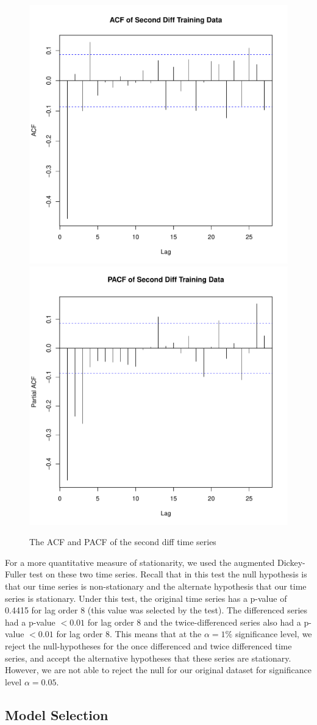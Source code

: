 \documentclass[11pt]{paper}
\begin{document}
\begin{figure}
\centering
\includegraphics[width=0.45\linewidth]{../image/acf_second_diff.pdf}
\includegraphics[width=0.45\linewidth]{../image/pacf_second_diff.pdf}
\caption{The ACF and PACF of the second diff time series}
\label{second_acf_pacf}
\end{figure}



For a more quantitative measure of stationarity, we used the augmented Dickey-Fuller test on these two time series. Recall that in this test the null hypothesis is that our time series is non-stationary and the alternate hypothesis that our time series is stationary. Under this test, the original time series has a p-value of 0.4415 for lag order 8 (this value was selected by the test). The differenced series had a p-value $< 0.01$ for lag order 8 and the twice-differenced series also had a p-value $<0.01$ for lag order 8. This means that at the $\alpha = 1\%$ significance level, we reject the null-hypotheses for the once differenced and twice differenced time series, and accept the alternative hypotheses that these series are stationary. However, we are not able to reject the null for our original dataset for significance level $\alpha=0.05$.

\subsection{Model Selection}
\end{document}
